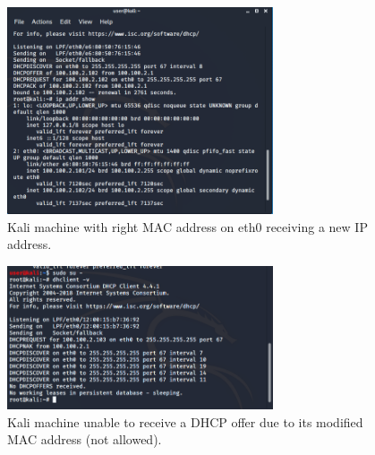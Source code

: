 \begin{figure}[htpb]
\centering
\includegraphics[width=0.7\textwidth]{dhcpoffer_received_kali.png}
\caption[a]{Kali machine with right MAC address on eth0 receiving a new IP address.}\label{fig:5}
\end{figure}

\begin{figure}[htpb]
\centering
\includegraphics[width=0.7\textwidth]{dhcp_request_undesired_MAC_no_response.png}
\caption[a]{Kali machine unable to receive a DHCP offer due to its modified MAC address (not allowed).}\label{fig:6}
\end{figure}
